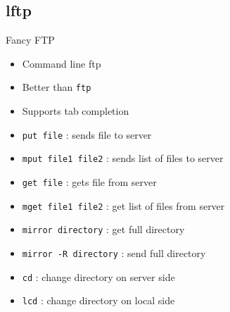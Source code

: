 \subsection{lftp}

\begin{frame}[fragile]{Fancy FTP}
  \begin{itemize}
    \pause \item Command line ftp
    \pause \item Better than \texttt{ftp}
    \pause \item Supports tab completion
    \pause \item \texttt{put file} : sends file to server
    \pause \item \texttt{mput file1 file2} : sends list of files to server
    \pause \item \texttt{get file} : gets file from server
    \pause \item \texttt{mget file1 file2} : get list of files from server
    \pause \item \texttt{mirror directory} : get full directory
    \pause \item \texttt{mirror -R directory} : send full directory
    \pause \item \texttt{cd} : change directory on server side
    \pause \item \texttt{lcd} : change directory on local side
  \end{itemize}
\end{frame}

